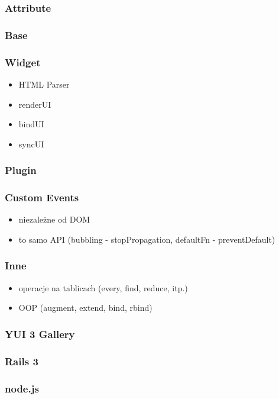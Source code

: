 \documentclass[16pt]{beamer}
\begin{document}
\begin{frame}
  \frametitle{Attribute}

\end{frame}

\begin{frame}
  \frametitle{Base}
\end{frame}

\begin{frame}
  \frametitle{Widget}
  \begin{itemize}
  \item HTML Parser
  \item renderUI
  \item bindUI
  \item syncUI
  \end{itemize}
\end{frame}

\begin{frame}
  \frametitle{Plugin}

\end{frame}

\begin{frame}
  \frametitle{Custom Events}
  \begin{itemize}
  \item niezależne od DOM
  \item to samo API (bubbling - stopPropagation, defaultFn - preventDefault)
  \end{itemize}
\end{frame}

\begin{frame}
  \frametitle{Inne}
  \begin{itemize}
  \item operacje na tablicach (every, find, reduce, itp.)
  \item OOP (augment, extend, bind, rbind)
  \end{itemize}
\end{frame}

\begin{frame}
  \frametitle{YUI 3 Gallery}
\end{frame}

\begin{frame}
  \frametitle{Rails 3}
\end{frame}

\begin{frame}
  \frametitle{node.js}
\end{frame}

\end{document}
